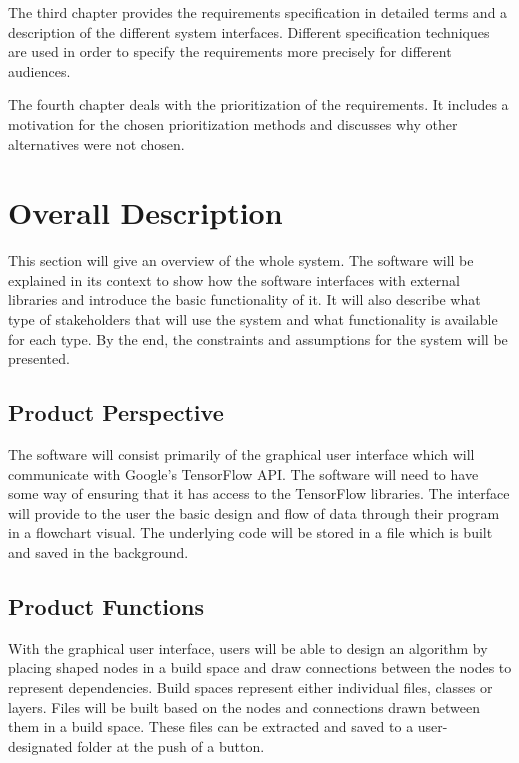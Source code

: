 \documentclass[a4paper,10pt]{article} \usepackage[margin=1.0in]{geometry} \usepackage{pdfpages} \usepackage{graphicx}
\begin{document}
The third chapter provides the requirements specification in detailed terms and a description of the different system interfaces. 
Different specification techniques are used in order to specify the requirements more precisely for different audiences.

The fourth chapter deals with the prioritization of the requirements. 
It includes a motivation for the chosen prioritization methods and discusses why other alternatives were not chosen.

\newpage

\section{Overall Description}

This section will give an overview of the whole system. 
The software will be explained in its context to show how the software interfaces with external libraries and introduce the basic functionality of it. 
It will also describe what type of stakeholders that will use the system and what functionality is available for each type. 
By the end, the constraints and assumptions for the system will be presented.

\subsection{Product Perspective}

The software will consist primarily of the graphical user interface which will communicate with Google's TensorFlow API. 
The software will need to have some way of ensuring that it has access to the TensorFlow libraries. 
The interface will provide to the user the basic design and flow of data through their program in a flowchart visual.
The underlying code will be stored in a file which is built and saved in the background. 

\subsection{Product Functions}

With the graphical user interface, users will be able to design an algorithm by placing shaped nodes in a build space and draw connections between the nodes to represent dependencies.
Build spaces represent either individual files, classes or layers. 
Files will be built based on the nodes and connections drawn between them in a build space.
These files can be extracted and saved to a user-designated folder at the push of a button.
\end{document}
